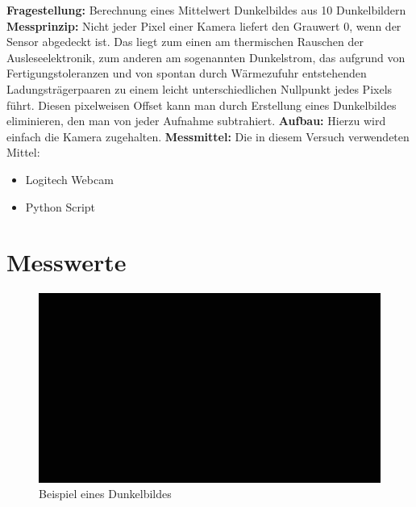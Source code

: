 \documentclass[12pt, oneside, a4paper, \docLanguage]{report}
\begin{document}
\begin{normalsize}
\textbf{Fragestellung:}\newline
Berechnung eines Mittelwert Dunkelbildes aus 10 Dunkelbildern\newline
\textbf{Messprinzip:}\newline
Nicht jeder Pixel einer Kamera liefert den Grauwert 0, wenn der Sensor abgedeckt ist. Das liegt
zum einen am thermischen Rauschen der Ausleseelektronik, zum anderen am sogenannten
Dunkelstrom, das aufgrund von Fertigungstoleranzen und von spontan durch Wärmezufuhr
entstehenden Ladungsträgerpaaren zu einem leicht unterschiedlichen Nullpunkt jedes Pixels
führt. Diesen pixelweisen Offset kann man durch Erstellung eines Dunkelbildes eliminieren,
den man von jeder Aufnahme subtrahiert.\newline
\textbf{Aufbau:}\newline
Hierzu wird einfach die Kamera zugehalten.\newline
\textbf{Messmittel:}\newline
Die in diesem Versuch verwendeten Mittel:
\begin{itemize}
\item Logitech Webcam
\item Python Script
\end{itemize}
\end{normalsize}

\section{Messwerte}
\label{chap:VERSUCH_2_MESSWERTE}
\begin{figure}[H]
\centering
\includegraphics[scale=0.5]{BlackImages/Black3.png}
\caption{Beispiel eines Dunkelbildes}
\end{figure}
\end{document}
